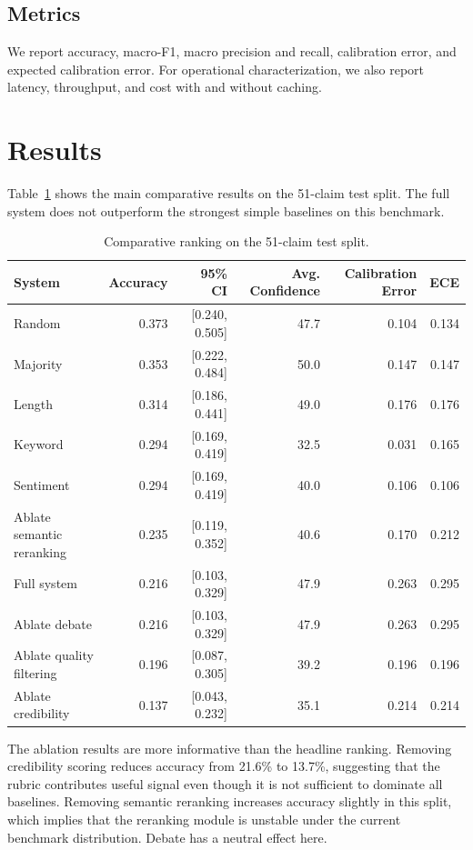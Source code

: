 \documentclass[11pt,a4paper]{article}
\begin{document}
\subsection{Metrics}

We report accuracy, macro-F1, macro precision and recall, calibration error, and expected calibration error. For operational characterization, we also report latency, throughput, and cost with and without caching.

\section{Results}

Table~\ref{tab:ranking} shows the main comparative results on the 51-claim test split. The full system does not outperform the strongest simple baselines on this benchmark.

\begin{table}[htbp]
\centering
\caption{Comparative ranking on the 51-claim test split.}
\label{tab:ranking}
\begin{tabular}{lrrrrr}
\toprule
System & Accuracy & 95\% CI & Avg. Confidence & Calibration Error & ECE \\
\midrule
Random & 0.373 & [0.240, 0.505] & 47.7 & 0.104 & 0.134 \\
Majority & 0.353 & [0.222, 0.484] & 50.0 & 0.147 & 0.147 \\
Length & 0.314 & [0.186, 0.441] & 49.0 & 0.176 & 0.176 \\
Keyword & 0.294 & [0.169, 0.419] & 32.5 & 0.031 & 0.165 \\
Sentiment & 0.294 & [0.169, 0.419] & 40.0 & 0.106 & 0.106 \\
Ablate semantic reranking & 0.235 & [0.119, 0.352] & 40.6 & 0.170 & 0.212 \\
Full system & 0.216 & [0.103, 0.329] & 47.9 & 0.263 & 0.295 \\
Ablate debate & 0.216 & [0.103, 0.329] & 47.9 & 0.263 & 0.295 \\
Ablate quality filtering & 0.196 & [0.087, 0.305] & 39.2 & 0.196 & 0.196 \\
Ablate credibility & 0.137 & [0.043, 0.232] & 35.1 & 0.214 & 0.214 \\
\bottomrule
\end{tabular}
\end{table}

The ablation results are more informative than the headline ranking. Removing credibility scoring reduces accuracy from 21.6\% to 13.7\%, suggesting that the rubric contributes useful signal even though it is not sufficient to dominate all baselines. Removing semantic reranking increases accuracy slightly in this split, which implies that the reranking module is unstable under the current benchmark distribution. Debate has a neutral effect here.
\end{document}
